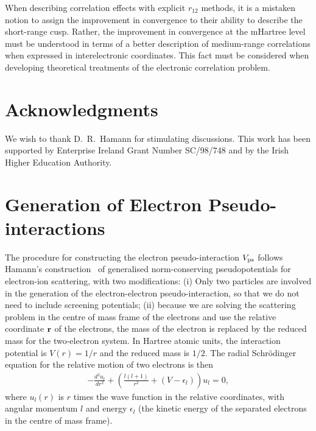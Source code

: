 When describing correlation effects with explicit $r_{12}$ methods, 
it is a mistaken notion to assign the improvement in convergence to 
their ability to describe the short-range cusp. 
Rather, the improvement in convergence at the mHartree level
must be understood in terms of a better description of medium-range 
correlations when expressed in interelectronic coordinates. 
This fact must be considered when developing theoretical treatments 
of the electronic correlation problem. 

\section{Acknowledgments}

We wish to thank D.~R.~Hamann for stimulating discussions.
This work has been supported by Enterprise Ireland Grant Number
SC/98/748 and by the Irish Higher Education Authority.



%

%
%
\appendix
%
%
\section{Generation of Electron Pseudo-interactions}
\label{app:gen_psint}
%
%
%

The procedure for constructing the electron pseudo-interaction 
$V_{\rm ps}$ follows Hamann's construction~\cite{Hamann:gncpp}
of generalised norm-conserving pseudopotentials for
electron-ion scattering, with two modifications: 
(i) Only two particles are involved in the generation of the electron-electron
pseudo-interaction, so that we do not need to include screening potentials;
(ii) because we are solving the scattering problem in the centre of
mass frame of the electrons and use the relative coordinate ${\bf r}$ 
of the electrons, the mass of the electron is replaced by the reduced 
mass for the two-electron system.
In Hartree atomic units, the interaction potential is 
$V(r) = 1/r$ and the reduced mass is $1/2$. 
The radial Schr\"{o}dinger equation for the relative motion of two
electrons is then
\begin{eqnarray}
 -\frac{d^2u_l}{dr^2} + \left(\frac{l(l+1)}{r^2}+(V-\epsilon_l)\right)u_l=0 ,
 \label{eq:rSchr}
\end{eqnarray}
where $u_l(r)$ is $r$ times the wave function in the relative coordinates,
with angular momentum $l$ and energy $\epsilon_l$ (the kinetic 
energy of the separated electrons in the centre of mass frame). 


